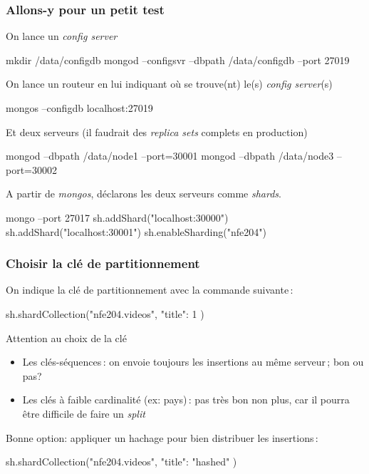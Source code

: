 \begin{frame}[fragile]
\frametitle{Allons-y pour un petit test}

On lance un \textit{config server}

\begin{smallverbatim}
mkdir /data/configdb
mongod --configsvr --dbpath /data/configdb --port 27019
\end{smallverbatim}

On lance un routeur en lui indiquant où se trouve(nt) le(s) \textit{config server}(s)

\begin{smallverbatim}
mongos --configdb localhost:27019
\end{smallverbatim}

Et deux serveurs (il faudrait des \textit{replica sets} complets en production)
\begin{smallverbatim}
mongod --dbpath /data/node1 --port=30001
mongod --dbpath /data/node3 --port=30002
\end{smallverbatim}

A partir de \textit{mongos}, déclarons les deux serveurs comme \textit{shards}.

\begin{smallverbatim}
mongo --port 27017
sh.addShard("localhost:30000")
sh.addShard("localhost:30001")
sh.enableSharding("nfe204")
\end{smallverbatim}

\end{frame}

\begin{frame}[fragile]
\frametitle{Choisir la clé de partitionnement}

On indique la clé de partitionnement avec la commande suivante\,:

\begin{smallverbatim}
sh.shardCollection("nfe204.videos", { "title": 1 } )
\end{smallverbatim}

Attention au choix de la clé

\begin{itemize}
  \item Les clés-séquences\,:  on envoie toujours les insertions au même serveur\,; bon ou pas?
  \item Les clés à faible cardinalité (ex: pays)\,: pas très bon non plus, car 
               il pourra être difficile de faire un \textit{split}
\end{itemize}

Bonne option: appliquer un hachage pour bien distribuer les insertions\,:

\begin{smallverbatim}
sh.shardCollection("nfe204.videos", { "title": "hashed" } )
\end{smallverbatim}

\end{frame}


